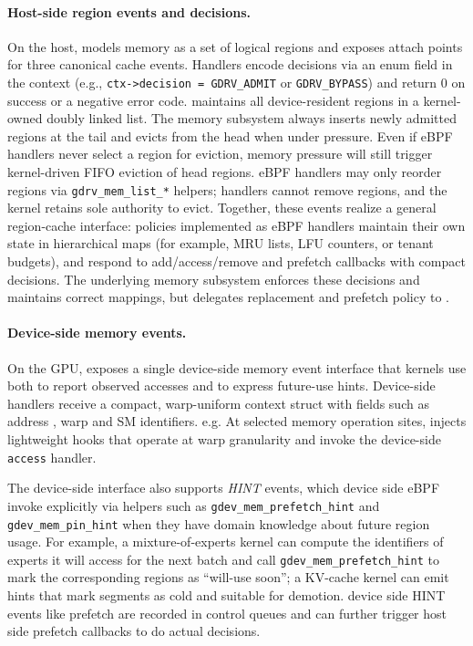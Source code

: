 \paragraph{Host-side region events and decisions.}
On the host, \sys models memory as a set of logical regions and exposes attach points for three
canonical cache events. Handlers encode decisions via an enum field in the context (e.g., \texttt{ctx->decision = GDRV\_ADMIT} or \texttt{GDRV\_BYPASS}) and return 0 on success or a negative error code. \sys maintains all device-resident regions in a kernel-owned doubly linked list. The memory subsystem always inserts newly admitted regions at the tail and evicts from the head when under pressure. Even if eBPF handlers never select a region for eviction, memory pressure will still trigger kernel-driven FIFO eviction of head regions. eBPF handlers may only reorder regions via \texttt{gdrv\_mem\_list\_*} helpers; handlers cannot remove regions, and the kernel retains sole authority to evict. Together, these events realize a
general region-cache interface: policies implemented as eBPF handlers maintain their
own state in hierarchical maps (for example, MRU lists, LFU counters, or tenant budgets),
and respond to add/access/remove and prefetch callbacks with compact decisions. The underlying memory subsystem enforces these decisions
and maintains correct mappings, but delegates replacement and prefetch policy to
\sys.

\paragraph{Device-side memory events.}

On the GPU, \sys exposes a single device-side memory event interface that kernels
use both to report observed accesses and to express future-use hints. Device-side
handlers receive a compact, warp-uniform context struct with fields such as address , warp and SM identifiers. e.g. At selected memory operation sites, \sys injects lightweight hooks that operate at
warp granularity and invoke the device-side \texttt{access} handler.

The device-side interface also supports \emph{HINT} events, which device side eBPF 
invoke explicitly via helpers such as \texttt{gdev\_mem\_prefetch\_hint} and \texttt{gdev\_mem\_pin\_hint} when they have domain knowledge about future region usage. For
example, a mixture-of-experts kernel can compute the identifiers of experts it
will access for the next batch and call \texttt{gdev\_mem\_prefetch\_hint} to mark
the corresponding regions as ``will-use soon'';
a KV-cache kernel can emit hints that mark segments as cold and suitable for
demotion. device side HINT events like prefetch are recorded in control queues and can further trigger host side prefetch callbacks to do actual decisions.

